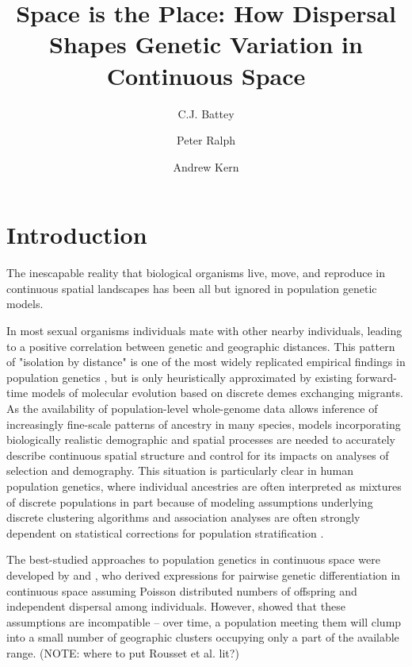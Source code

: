 \documentclass[9pt,twocolumn,twoside,lineno]{gsajnl}
\title{Space is the Place: How Dispersal Shapes Genetic Variation in Continuous Space}
\author[$\ast$,1]{C.J. Battey}
\author[$\ast$]{Peter Ralph}
\author[$\ast$]{Andrew Kern}
\affil[$\ast$]{University of Oregon Dept. Biology, Institute for Ecology Evolution}
\begin{document}
\maketitle
\thispagestyle{firststyle}
\marginmark
\firstpagefootnote


\vspace{-35pt}%

\section{Introduction}
The inescapable reality that biological organisms live, move, and reproduce in continuous spatial landscapes has been all but ignored in population genetic models. 

In most sexual organisms individuals mate with other nearby individuals, leading to a positive correlation between genetic and geographic distances. This pattern of "isolation by distance" \citep{Wright1943} is one of the most widely replicated empirical findings in population genetics \citep{Chen2017,Jay2012,Sharbel2000}, but is only heuristically approximated by existing forward-time models of molecular evolution based on discrete demes exchanging migrants. As the availability of population-level whole-genome data allows inference of increasingly fine-scale patterns of ancestry in many species, models incorporating biologically realistic demographic and spatial processes are needed to accurately describe continuous spatial structure and control for its impacts on analyses of selection and demography. This situation is particularly clear in human population genetics, where individual ancestries are often interpreted as mixtures of discrete populations in part because of modeling assumptions underlying discrete clustering algorithms and association analyses are often strongly dependent on statistical corrections for population stratification \citep{Berg2018}.  

The best-studied approaches to population genetics in continuous space were developed by \citep{Wright1943} and \citep{Malecot1948}, who derived expressions for pairwise genetic differentiation in continuous space assuming Poisson distributed numbers of offspring and independent dispersal among individuals. However, \citep{Felsenstein1975} showed that these assumptions are incompatible -- over time, a population meeting them will clump into a small number of geographic clusters occupying only a part of the available range. (NOTE: where to put Rousset et al. lit?)
\end{document}

